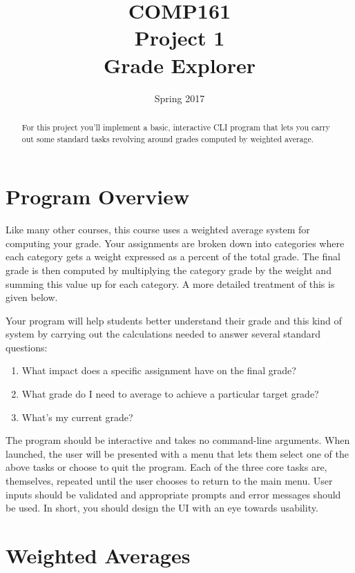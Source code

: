 \documentclass[]{tufte-handout}
\title{COMP161 \\ Project 1 \\ Grade Explorer}
\author{}
\date{Spring 2017}
\begin{document}
\maketitle

\begin{abstract}
For this project you'll implement a basic, interactive CLI program that lets you carry out some standard tasks revolving around grades computed by weighted average.
\end{abstract}

\section{Program Overview}

Like many other courses, this course uses a weighted average system for computing your grade. Your assignments are broken down into categories where each category gets a weight expressed as a percent of the total grade. The final grade is then computed by multiplying the category grade by the weight and summing this value up for each category. A more detailed treatment of this is given below.

Your program will help students better understand their grade and this kind of system by carrying out the calculations needed to answer several standard questions:
\begin{enumerate}
  \item What impact does a specific assignment have on the final grade?
  \item What grade do I need to average to achieve a particular target grade?
  \item What's my current grade?
\end{enumerate}

The program should be interactive and takes no command-line arguments. When launched, the user will be presented with a menu that lets them select one of the above tasks or choose to quit the program. Each of the three core tasks are, themselves, repeated until the user chooses to return to the main menu. User inputs should be validated and appropriate prompts and error messages should be used. In short, you should design the UI with an eye towards usability.


\section{Weighted Averages}\label{sec:wAvg}
\end{document}

